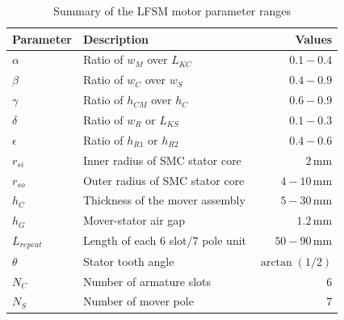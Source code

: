             
            \begin{table}
                \renewcommand{\arraystretch}{1.2}
                \caption{Summary of the \acs{LFSM} motor parameter ranges}
                \label{table:chap/rsm/LFSM/design range}
                \centering
                \begin{tabular}{@{}llr@{}}
                \hline
                \bfseries Parameter & \bfseries Description & \bfseries Values\\
                \hline
                    $\alpha$	    & Ratio of $w_M$ over $L_{KC}$              &	$0.1-0.4$\\ 
                    $\beta$	        & Ratio of $w_C$ over $w_S$		            &	$0.4-0.9$\\ 
                    $\gamma$	    & Ratio of $h_{CM}$ over $h_C$			    &	$0.6-0.9$\\ 
                    $\delta$	    & Ratio of $w_R$ or $L_{KS}$		        &	$0.1-0.3$\\ 
                    $\epsilon$	    & Ratio of $h_{R1}$ or $h_{R2}$		        &	$0.4-0.6$\\ 
                    $r_{si}$	    & Inner radius of SMC stator core 	        &	$2\,\mathrm{mm}$\\ 
                    $r_{so}$	    & Outer radius of SMC stator core 			&	$4-10\,\mathrm{mm}$\\ 
                    $h_C$           & Thickness of the mover assembly           &	$5-30\,\mathrm{mm}$\\ 
                    $h_G$	        & Mover-stator air gap 					    &	$1.2\,\mathrm{mm}$\\ 
                    $L_{repeat}$	& Length of each 6 slot/7 pole unit 		&	$50-90\,\mathrm{mm}$\\ 
                    $\theta$	    & Stator tooth angle 		                &	$\arctan(1/2)$\\ 
                    $N_C$	        & Number of armature slots 		            &	$6$\\ 
                    $N_S$	        & Number of mover pole 		                &	$7$\\ 
                \hline
                \end{tabular}
            \end{table}
            
